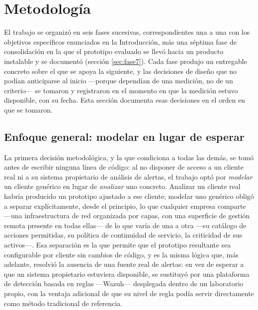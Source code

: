 
\chapter{Metodología}
\label{cap:metodologia}

El trabajo se organizó en seis fases sucesivas, correspondientes una a una con los objetivos
específicos enunciados en la Introducción, más una séptima fase de consolidación en la que el
prototipo evaluado se llevó hacia un producto instalable y se documentó (sección \ref{sec:fase7}). Cada
fase produjo un entregable concreto sobre el que se apoya la siguiente, y las decisiones de diseño
que no podían anticiparse al inicio ---porque dependían de una medición, no de un criterio--- se
tomaron y registraron en el momento en que la medición estuvo disponible, con su fecha. Esta
sección documenta esas decisiones en el orden en que se tomaron.

\section{Enfoque general: modelar en lugar de esperar}

La primera decisión metodológica, y la que condiciona a todas las demás, se tomó antes de escribir
ninguna línea de código: al no disponer de acceso a un cliente real ni a su sistema propietario de
análisis de alertas, el trabajo optó por \emph{modelar} un cliente genérico en lugar de
\emph{analizar} uno concreto. Analizar un cliente real habría producido un prototipo ajustado a ese
cliente; modelar uno genérico obligó a separar explícitamente, desde el principio, lo que cualquier
empresa comparte ---una infraestructura de red organizada por capas, con una superficie de gestión
remota presente en todas ellas--- de lo que varía de una a otra ---su catálogo de acciones permitidas,
su política de continuidad de servicio, la criticidad de sus activos---. Esa separación es la que
permite que el prototipo resultante sea configurable por cliente sin cambios de código, y es la
misma lógica que, más adelante, resolvió la ausencia de una fuente real de alertas: en vez de
esperar a que un sistema propietario estuviera disponible, se sustituyó por una plataforma de
detección basada en reglas ---Wazuh--- desplegada dentro de un laboratorio propio, con la ventaja
adicional de que su nivel de regla podía servir directamente como método tradicional de referencia.


